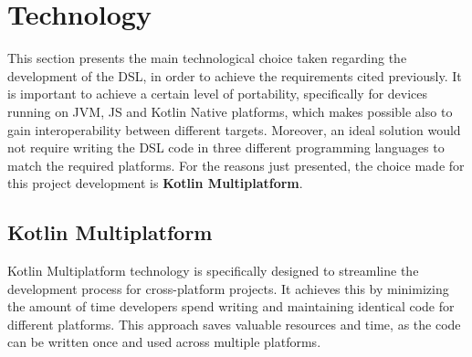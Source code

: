 \section{Technology}\label{section:technology_choices}
This section presents the main technological choice taken regarding the development of the DSL, in order to achieve the requirements cited previously.\newline
It is important to achieve a certain level of portability, specifically for devices running on JVM, JS and Kotlin Native platforms, which makes possible also to gain interoperability between different targets. Moreover, an ideal solution would not require writing the DSL code in three different programming languages to match the required platforms.\newline
For the reasons just presented, the choice made for this project development is \textbf{Kotlin Multiplatform}.

\subsection{Kotlin Multiplatform}
Kotlin Multiplatform technology is specifically designed to streamline the development process for cross-platform projects.\newline
It achieves this by minimizing the amount of time developers spend writing and maintaining identical code for different platforms. This approach saves valuable resources and time, as the code can be written once and used across multiple platforms.


